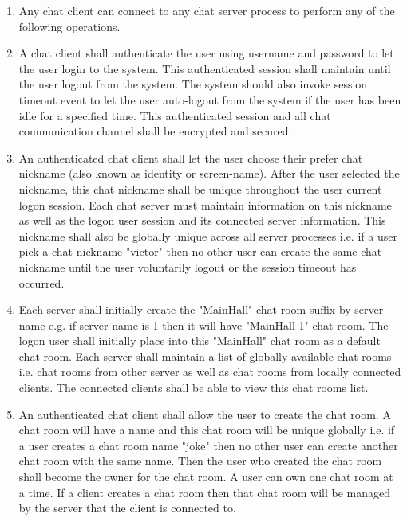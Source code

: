 \documentclass[dareport.tex]{subfiles}
\begin{document}
\begin{enumerate}[leftmargin=*]
\item Any chat client can connect to any chat server process to perform any of the following operations.

\item A chat client shall authenticate the user using username and password to let the user login to the system. This authenticated session shall maintain until the user logout from the system. The system should also invoke session timeout event to let the user auto-logout from the system if the user has been idle for a specified time. This authenticated session and all chat communication channel shall be encrypted and secured. 

\item An authenticated chat client shall let the user choose their prefer chat nickname (also known as identity or screen-name). After the user selected the nickname, this chat nickname shall be unique throughout the user current logon session. Each chat server must maintain information on this nickname as well as the logon user session and its connected server information. This nickname shall also be globally unique across all server processes i.e. if a user pick a chat nickname "victor" then no other user can create the same chat nickname until the user voluntarily logout or the session timeout has occurred.

\item Each server shall initially create the "MainHall" chat room suffix by server name e.g. if server name is 1 then it will have "MainHall-1" chat room. The logon user shall initially place into this "MainHall" chat room as a default chat room. Each server shall maintain a list of globally available chat rooms i.e. chat rooms from other server as well as chat rooms from locally connected clients. The connected clients shall be able to view this chat rooms list.

\item An authenticated chat client shall allow the user to create the chat room. A chat room will have a name and this chat room will be unique globally i.e. if a user creates a chat room name "joke" then no other user can create another chat room with the same name. Then the user who created the chat room shall become the owner for the chat room. A user can own one chat room at a time. If a client creates a chat room then that chat room will be managed by the server that the client is connected to.


\end{enumerate}
\end{document}
